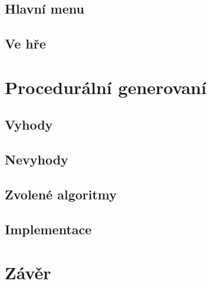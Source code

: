 \documentclass{beamer}
\begin{document}
	\subsection{Hlavní menu}	
	\subsection{Ve hře}	
\section{Procedurální generovaní}
	\subsection{Vyhody}
	\subsection{Nevyhody}
	\subsection{Zvolené algoritmy}
	\subsection{Implementace}
\section{Závěr}
 
\end{document}
